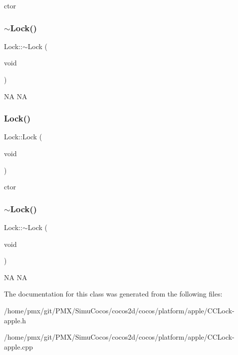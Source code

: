 ctor \mbox{\label{classLock_ab1bf86c77a1c172f96d3076992e0a23b}} 
\subsubsection{\texorpdfstring{$\sim$\+Lock()}{~Lock()}\hspace{0.1cm}{\footnotesize\ttfamily [1/2]}}
{\footnotesize\ttfamily Lock\+::$\sim$\+Lock (\begin{DoxyParamCaption}\item[{void}]{ }\end{DoxyParamCaption})}

NA  NA \mbox{\label{classLock_a75e46c7992bbadf39c5d21f078c5a996}} 
\subsubsection{\texorpdfstring{Lock()}{Lock()}\hspace{0.1cm}{\footnotesize\ttfamily [2/2]}}
{\footnotesize\ttfamily Lock\+::\+Lock (\begin{DoxyParamCaption}\item[{void}]{ }\end{DoxyParamCaption})}

ctor \mbox{\label{classLock_ab1bf86c77a1c172f96d3076992e0a23b}} 
\subsubsection{\texorpdfstring{$\sim$\+Lock()}{~Lock()}\hspace{0.1cm}{\footnotesize\ttfamily [2/2]}}
{\footnotesize\ttfamily Lock\+::$\sim$\+Lock (\begin{DoxyParamCaption}\item[{void}]{ }\end{DoxyParamCaption})}

NA  NA 

The documentation for this class was generated from the following files\+:\begin{DoxyCompactItemize}
\item 
/home/pmx/git/\+P\+M\+X/\+Simu\+Cocos/cocos2d/cocos/platform/apple/C\+C\+Lock-\/apple.\+h\item 
/home/pmx/git/\+P\+M\+X/\+Simu\+Cocos/cocos2d/cocos/platform/apple/C\+C\+Lock-\/apple.\+cpp\end{DoxyCompactItemize}
